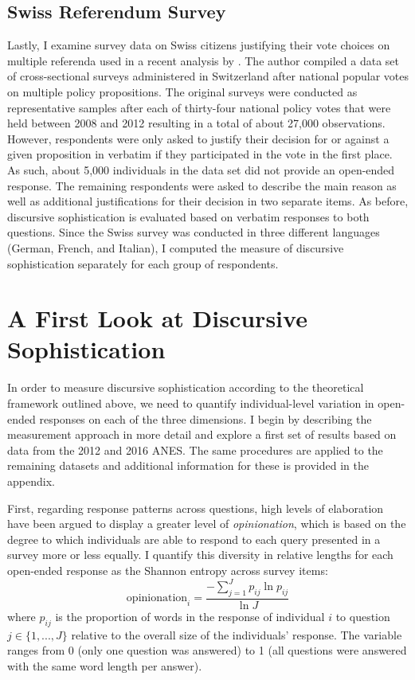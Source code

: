 \subsection*{Swiss Referendum Survey}
Lastly, I examine survey data on Swiss citizens justifying their vote choices on multiple referenda used in a recent analysis by \citet{colombo2016justifications}. The author compiled a data set of cross-sectional surveys administered in Switzerland after national popular votes on multiple policy propositions. The original surveys were conducted as representative samples after each of thirty-four national policy votes that were held between 2008 and 2012 resulting in a total of about 27,000 observations. However, respondents were only asked to justify their decision for or against a given proposition in verbatim if they participated in the vote in the first place. As such, about 5,000 individuals in the data set did not provide an open-ended response. The remaining respondents were asked to describe the main reason as well as additional justifications for their decision in two separate items. As before, discursive sophistication is evaluated based on verbatim responses to both questions. Since the Swiss survey was conducted in three different languages (German, French, and Italian), I computed the measure of discursive sophistication separately for each group of respondents.



\section*{A First Look at Discursive Sophistication}

In order to measure discursive sophistication according to the theoretical framework outlined above, we need to quantify individual-level variation in open-ended responses on each of the three dimensions. I begin by describing the measurement approach in more detail and explore a first set of results based on data from the 2012 and 2016 ANES. The same procedures are applied to the remaining datasets and additional information for these is provided in the appendix.

First, regarding response patterns across questions, high levels of elaboration have been argued to display a greater level of \textit{opinionation}, which is based on the degree to which individuals are able to respond to each query presented in a survey more or less equally. I quantify this diversity in relative lengths for each open-ended response as the Shannon entropy across survey items:
\begin{equation}
\text{opinionation}_i = \dfrac{-\sum_{j=1}^J p_{ij} \ln p_{ij}}{\ln J}
\end{equation}
where $p_{ij}$ is the proportion of words in the response of individual $i$ to question $j\in \{1,...,J\}$ relative to the overall size of the individuals' response. The variable ranges from 0 (only one question was answered) to 1 (all questions were answered with the same word length per answer).

